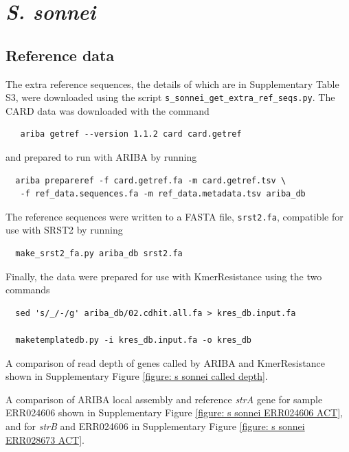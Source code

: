 \documentclass[11pt, a4paper]{article}
\begin{document}
\clearpage

\section{\emph{S. sonnei}}

\subsection{Reference data}
The extra reference sequences, the details of which are in
Supplementary Table S3,  were downloaded using the script
\verb+s_sonnei_get_extra_ref_seqs.py+. The CARD data was downloaded
with the command
\begin{verbatim}
   ariba getref --version 1.1.2 card card.getref
\end{verbatim}
and prepared to run with ARIBA by running
\begin{verbatim}
  ariba prepareref -f card.getref.fa -m card.getref.tsv \
   -f ref_data.sequences.fa -m ref_data.metadata.tsv ariba_db
\end{verbatim}
The reference sequences were written to a FASTA file,
\verb+srst2.fa+, compatible
for use with SRST2 by running
\begin{verbatim}
  make_srst2_fa.py ariba_db srst2.fa
\end{verbatim}
Finally, the data were prepared for use with KmerResistance using
the two commands
\begin{verbatim}
  sed 's/_/-/g' ariba_db/02.cdhit.all.fa > kres_db.input.fa

  maketemplatedb.py -i kres_db.input.fa -o kres_db
\end{verbatim}


A comparison of read depth of genes called by ARIBA and KmerResistance
shown in Supplementary Figure \ref{figure: s sonnei called depth}.

A comparison of ARIBA local assembly and reference \emph{strA} gene for sample
ERR024606 shown in Supplementary Figure \ref{figure: s sonnei ERR024606 ACT}, and for
\emph{strB} and ERR024606 in Supplementary Figure \ref{figure: s sonnei ERR028673 ACT}.
\end{document}
